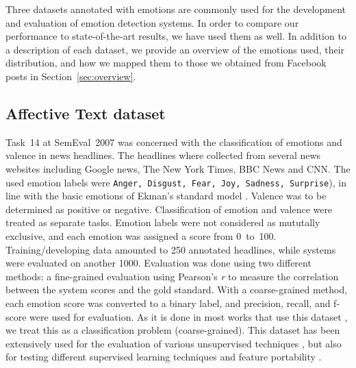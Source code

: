 \documentclass[11pt]{article}
\begin{document}
Three datasets annotated with emotions are commonly used for the development and evaluation of emotion detection systems. In order to compare our performance to state-of-the-art results, we have used them as well. In addition to a description of each dataset, we provide an overview of the emotions used, their distribution, and how we mapped them to those we obtained from Facebook posts in Section~\ref{sec:overview}.

\subsection{Affective Text dataset}
\label{sec:data:affect}
Task~14 at SemEval~2007  \cite{strapparava2007semeval} was concerned with the classification of emotions and valence in news headlines. The headlines where collected from several news websites including Google news,  The New York Times, BBC News and CNN. The used emotion labels were \texttt{Anger, Disgust, Fear, Joy, Sadness, Surprise}), in line with the basic emotions of Ekman's standard model \cite{ekman1992argument}. Valence was to be determined as positive or negative. Classification of emotion and valence were treated as separate tasks. 
Emotion labels were not considered as mututally exclusive, and each emotion was assigned a score from 0~to~100. Training/developing data amounted to 250 annotated headlines, while systems were evaluated on another 1000. Evaluation was done using two different methods: a fine-grained evaluation using Pearson's \textit{r}  to measure the correlation between the system scores and the gold standard. With a coarse-grained method, each emotion score was converted to a binary label, and precision, recall, and f-score were used for evaluation. As it is done in most works that use this dataset \cite{chaffar2011using,calvo2013emotions,kim2010evaluation}, we treat this as a classification problem (coarse-grained).  This dataset has been extensively used for the evaluation of various unsupervised techniques \cite{strapparava2008learning}, but also for testing different supervised learning techniques and feature portability \cite{mohammad:2012:NAACL-HLT}.

%
%
\end{document}
